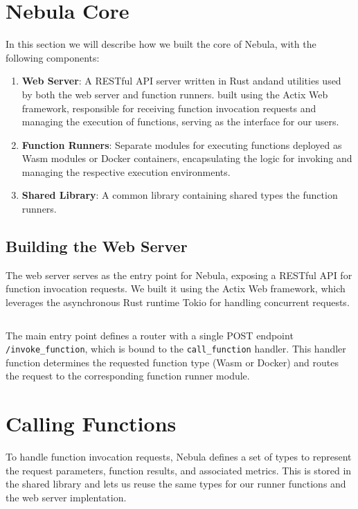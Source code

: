 \documentclass[
  table]{report}
\begin{document}
\section{Nebula Core}

In this section we will describe how we built the core of Nebula, with
the following components:

\begin{enumerate}
\def\labelenumi{\arabic{enumi}.}
\item
  \textbf{Web Server}: A RESTful API server written in Rust andand
  utilities used by both the web server and function runners. built
  using the Actix Web framework, responsible for receiving function
  invocation requests and managing the execution of functions, serving
  as the interface for our users.
\item
  \textbf{Function Runners}: Separate modules for executing functions
  deployed as Wasm modules or Docker containers, encapsulating the logic
  for invoking and managing the respective execution environments.
\item
  \textbf{Shared Library}: A common library containing shared types the
  function runners.
\end{enumerate}

\subsection{Building the Web Server}

The web server serves as the entry point for Nebula, exposing a RESTful
API for function invocation requests. We built it using the Actix Web
framework, which leverages the asynchronous Rust runtime Tokio for
handling concurrent requests.

\inputminted{rust}{assets/code/web_server.rs}

The main entry point defines a router with a single POST endpoint
\texttt{/invoke\_function}, which is bound to the
\texttt{call\_function} handler. This handler function determines the
requested function type (Wasm or Docker) and routes the request to the
corresponding function runner module.

\section{Calling Functions}

To handle function invocation requests, Nebula defines a set of types to
represent the request parameters, function results, and associated
metrics. This is stored in the shared library and lets us reuse the same
types for our runner functions and the web server implentation.
\end{document}
